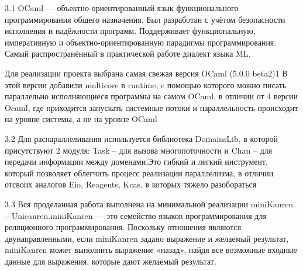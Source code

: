 3.1 OCaml — объектно-ориентированный язык
функционального программирования общего назначения.
Был разработан с учётом безопасности исполнения и надёжности 
программ. Поддерживает функциональную, императивную
и объектно-ориентированную парадигмы программирования. 
Самый распространённый в практической работе диалект языка ML. 

Для реализации проекта выбрана самая свежая версия OCaml (5.0.0 beta2)1
В этой версии добавили multicore в runtime, c помощью которого можно
писать параллельно исполняющиеся программы на самом OCaml, в отличии от 4 версии
Ocaml, где приходится запускать системные потоки и параллельность происходит на уровне системы, 
а не на уровне OCaml

3.2 Для распараллеливания используется библиотека DomainsLib, в
которой присутствуют 2 модуля: Task – для вызова
многопоточности и Chan – для передачи информации между
доменами.Это гибкий и легкий инструмент, который позволяет 
облегчить процесс реализации параллелизма, в отличии отсвоих 
аналогов Eio, Reagents, Kcas, в которых тяжело разобораться

3.3 Вся проделанная работа выполнена на минимальной реализации
miniKanren – Unicanren.miniKanren — это семейство 
языков программирования для реляционного программирования. 
Поскольку отношения являются двунаправленными, если miniKanren 
задано выражение и желаемый результат, miniKanren может выполнить 
выражение «назад», найдя все возможные входные данные для 
выражения, которые дают желаемый результат.
